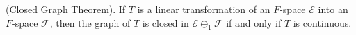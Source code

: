 (Closed Graph Theorem). If $T$ is a linear transformation of an $F$-space $\mathcal{E}$ into an $F$-space $\mathcal{F}$, then the graph of $T$ is closed in $\mathcal{E} \oplus_1 \mathcal{F}$ if and only if $T$ is continuous.
